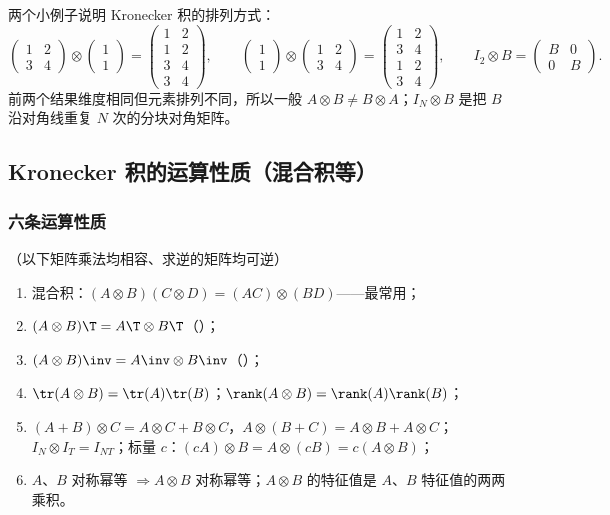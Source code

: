 两个小例子说明 Kronecker 积的排列方式：
\[
\begin{pmatrix}1&2\\3&4\end{pmatrix}\otimes\begin{pmatrix}1\\1\end{pmatrix}=\begin{pmatrix}1&2\\1&2\\3&4\\3&4\end{pmatrix},\qquad
\begin{pmatrix}1\\1\end{pmatrix}\otimes\begin{pmatrix}1&2\\3&4\end{pmatrix}=\begin{pmatrix}1&2\\3&4\\1&2\\3&4\end{pmatrix},\qquad
I_2\otimes B=\begin{pmatrix}B&0\\0&B\end{pmatrix}.
\]
前两个结果维度相同但元素排列不同，所以一般 $A\otimes B\neq B\otimes A$；$I_N\otimes B$ 是把 $B$ 沿对角线重复 $N$ 次的分块对角矩阵。

\subsection{Kronecker 积的运算性质（混合积等）}

\subsubsection{六条运算性质}

\begin{thm}\label{thm:U01a-kronprop}
（以下矩阵乘法均相容、求逆的矩阵均可逆）
\begin{enumerate}
  \item 混合积：$(A\otimes B)(C\otimes D)=(AC)\otimes(BD)$——最常用；
  \item $(A\otimes B)\T=A\T\otimes B\T$（）；
  \item $(A\otimes B)\inv=A\inv\otimes B\inv$（）；
  \item $\tr(A\otimes B)=\tr(A)\tr(B)$；$\rank(A\otimes B)=\rank(A)\rank(B)$；
  \item $(A+B)\otimes C=A\otimes C+B\otimes C$，$A\otimes(B+C)=A\otimes B+A\otimes C$；$I_N\otimes I_T=I_{NT}$；标量 $c$：$(cA)\otimes B=A\otimes(cB)=c(A\otimes B)$；
  \item $A$、$B$ 对称幂等 $\Rightarrow A\otimes B$ 对称幂等；$A\otimes B$ 的特征值是 $A$、$B$ 特征值的两两乘积。
\end{enumerate}
\end{thm}

